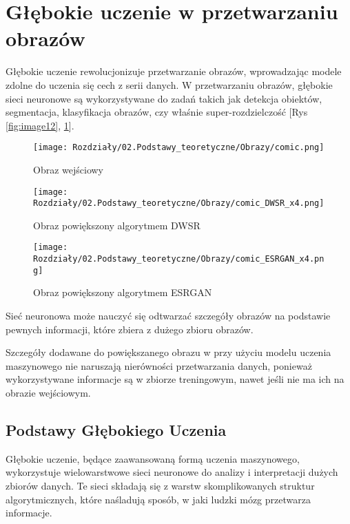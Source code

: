 
\section{Głębokie uczenie w przetwarzaniu obrazów}


Głębokie uczenie rewolucjonizuje przetwarzanie obrazów, wprowadzając modele zdolne do uczenia się cech z serii danych. W przetwarzaniu obrazów, głębokie sieci neuronowe są wykorzystywane do zadań takich jak detekcja obiektów, segmentacja, klasyfikacja obrazów, czy właśnie super-rozdzielczość [Rys \ref{fig:image12},  \ref{fig:image13}].

\begin{figure}[ht]
    \centering
    \begin{minipage}[t]{0.3\linewidth}
        \texttt{[image: Rozdziały/02.Podstawy\_teoretyczne/Obrazy/comic.png]}
        \caption{Obraz wejściowy}
        \label{fig:image11}
    \end{minipage}
    \hspace{0.5cm}
    \begin{minipage}[t]{0.3\linewidth}
        \texttt{[image: Rozdziały/02.Podstawy\_teoretyczne/Obrazy/comic\_DWSR\_x4.png]}
        \caption{Obraz powiększony algorytmem DWSR}
        \label{fig:image12}
    \end{minipage}
    \hspace{0.5cm}
    \begin{minipage}[t]{0.3\linewidth}
        \texttt{[image: Rozdziały/02.Podstawy\_teoretyczne/Obrazy/comic\_ESRGAN\_x4.png]}
        \caption{Obraz powiększony algorytmem ESRGAN}
        \label{fig:image13}
    \end{minipage}
\end{figure}

Sieć neuronowa może nauczyć się odtwarzać szczegóły obrazów na podstawie pewnych informacji, które zbiera z dużego zbioru obrazów. 

Szczegóły dodawane do powiększanego obrazu w przy użyciu modelu uczenia maszynowego nie naruszają nierówności przetwarzania danych, ponieważ wykorzystywane informacje są w zbiorze treningowym, nawet jeśli nie ma ich na obrazie wejściowym.


\subsection*{Podstawy Głębokiego Uczenia}
Głębokie uczenie, będące zaawansowaną formą uczenia maszynowego, wykorzystuje wielowarstwowe sieci neuronowe do analizy i interpretacji dużych zbiorów danych. Te sieci składają się z warstw skomplikowanych struktur algorytmicznych, które naśladują sposób, w jaki ludzki mózg przetwarza informacje.


